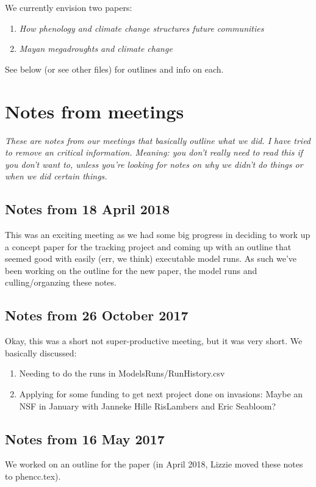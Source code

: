 \documentclass[11pt,a4paper,oneside]{article}
\begin{document}
 We currently envision two papers: 
\begin{enumerate}
\item \emph{How phenology and climate change structures future communities}
\item \emph{Mayan megadroughts and climate change} 
\end{enumerate}
See below (or see other files) for outlines and info on each.

\section{Notes from meetings}
\emph{These are notes from our meetings that basically outline what we did. I have tried to remove an critical information. Meaning: you don't really need to read this if you don't want to, unless you're looking for notes on why we didn't do things or when we did certain things.}

\subsection{Notes from 18 April 2018}
This was an exciting meeting as we had some big progress in deciding to work up a concept paper for the tracking project and coming up with an outline that seemed good with easily (err, we think) executable model runs. As such we've been working on the outline for the new paper, the model runs and culling/organzing these notes.

\subsection{Notes from 26 October 2017}
Okay, this was a short not super-productive meeting, but it was very short. We basically discussed:
\begin{enumerate} 
\item Needing to do the runs in ModelsRuns/RunHistory.csv
\item Applying for some funding to get next project done on invasions: Maybe an NSF in January with Janneke Hille RisLambers and Eric Seabloom?
\end{enumerate} 

\subsection{Notes from 16 May 2017}
We worked on an outline for the paper (in April 2018, Lizzie moved these notes to phencc.tex).
\end{document}
